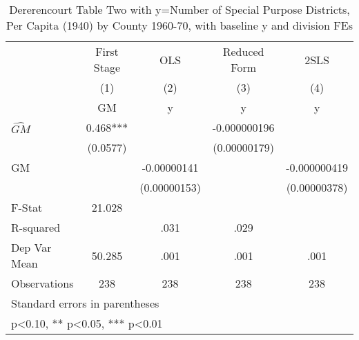 \begin{table}[htbp]\centering
\def\sym#1{\ifmmode^{#1}\else\(^{#1}\)\fi}
\caption{Dererencourt Table Two with y=Number of Special Purpose Districts, Per Capita (1940) by County 1960-70, with baseline y and division FEs}
\begin{tabular}{l*{4}{c}}
\toprule
                    & First Stage   &         OLS   &Reduced Form   &        2SLS   \\
                    &\multicolumn{1}{c}{(1)}&\multicolumn{1}{c}{(2)}&\multicolumn{1}{c}{(3)}&\multicolumn{1}{c}{(4)}\\
                    &\multicolumn{1}{c}{GM}&\multicolumn{1}{c}{y}&\multicolumn{1}{c}{y}&\multicolumn{1}{c}{y}\\
\midrule
$\hat{GM}$          &       0.468***&               &-0.000000196   &               \\
                    &    (0.0577)   &               &(0.00000179)   &               \\
\addlinespace
GM                  &               & -0.00000141   &               &-0.000000419   \\
                    &               &(0.00000153)   &               &(0.00000378)   \\
\midrule
F-Stat              &      21.028   &               &               &               \\
R-squared           &               &        .031   &        .029   &               \\
Dep Var Mean        &      50.285   &        .001   &        .001   &        .001   \\
Observations        &         238   &         238   &         238   &         238   \\
\bottomrule
\multicolumn{5}{l}{\footnotesize Standard errors in parentheses}\\
\multicolumn{5}{l}{\footnotesize * p<0.10, ** p<0.05, *** p<0.01}\\
\end{tabular}
\end{table}
